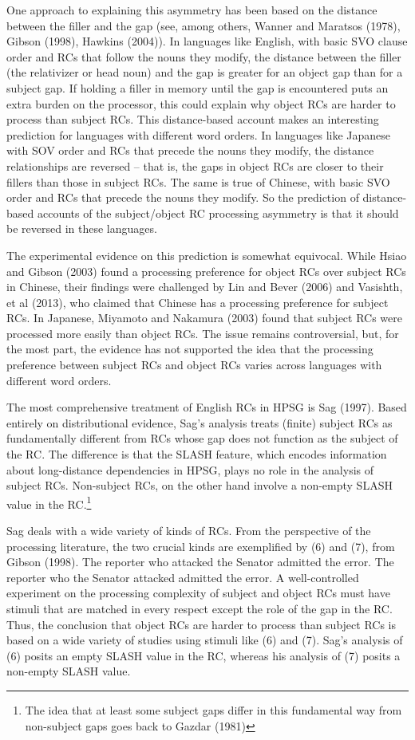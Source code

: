 \documentclass[a4paper]{article}
\begin{document}
One approach to explaining this asymmetry has been based on the distance between the filler and the gap (see, among others, Wanner and Maratsos (1978), Gibson (1998), Hawkins (2004)).  In languages like English, with basic SVO clause order and RCs that follow the nouns they modify, the distance between the filler (the relativizer or head noun) and the gap is greater for an object gap than for a subject gap.  If holding a filler in memory until the gap is encountered puts an extra burden on the processor, this could explain why object RCs are harder to process than subject RCs.   This distance-based account makes an interesting prediction for languages with different word orders.  In languages like Japanese with SOV order and RCs that precede the nouns they modify, the distance relationships are reversed -- that is, the gaps in object RCs are closer to their fillers than those in subject RCs.  The same is true of Chinese, with basic SVO order and RCs that precede the nouns they modify.  So the prediction of distance-based accounts of the subject/object RC processing asymmetry is that it should be reversed in these languages.

The experimental evidence on this prediction is somewhat equivocal.  While Hsiao and Gibson (2003) found a processing preference for object RCs over subject RCs in Chinese, their findings were challenged by Lin and Bever (2006) and Vasishth, et al (2013), who claimed that Chinese has a processing preference for subject RCs.  In Japanese, Miyamoto and Nakamura (2003) found that subject RCs were processed more easily than object RCs.  The issue remains controversial, but, for the most part, the evidence has not supported the idea that the processing preference between subject RCs and object RCs varies across languages with different word orders.

The most comprehensive treatment of English RCs in HPSG is Sag (1997). Based entirely on distributional evidence, Sag's analysis treats (finite) subject RCs as fundamentally different from RCs whose gap does not function as the subject of the RC.  The difference is that the SLASH feature, which encodes information about long-distance dependencies in HPSG, plays no role in the analysis of subject RCs.  Non-subject RCs, on the other hand involve a non-empty SLASH value in the RC.\footnote{The idea that at least some subject gaps differ in this fundamental way from non-subject gaps goes back to Gazdar (1981)}   

Sag deals with a wide variety of kinds of RCs. From the perspective of the processing literature, the two crucial kinds are exemplified by (6) and (7), from Gibson (1998).
\eal
\ex The reporter who attacked the Senator admitted the error.
\ex The reporter who the Senator attacked admitted the error.
\zl
A well-controlled experiment on the processing complexity of subject and object RCs must have stimuli that are matched in every respect except the role of the gap in the RC.  Thus, the conclusion that object RCs are harder to process than subject RCs is based on a wide variety of studies using stimuli like (6) and (7).  Sag's analysis of (6) posits an empty SLASH value in the RC, whereas his analysis of (7) posits a non-empty SLASH value.  
\end{document}
